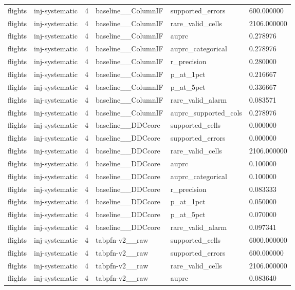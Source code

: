 \begin{tabular}{llllll}
flights & inj-systematic & 4 & baseline\_\_ColumnIF & supported\_errors & 600.000000 \\
flights & inj-systematic & 4 & baseline\_\_ColumnIF & rare\_valid\_cells & 2106.000000 \\
flights & inj-systematic & 4 & baseline\_\_ColumnIF & auprc & 0.278976 \\
flights & inj-systematic & 4 & baseline\_\_ColumnIF & auprc\_categorical & 0.278976 \\
flights & inj-systematic & 4 & baseline\_\_ColumnIF & r\_precision & 0.280000 \\
flights & inj-systematic & 4 & baseline\_\_ColumnIF & p\_at\_1pct & 0.216667 \\
flights & inj-systematic & 4 & baseline\_\_ColumnIF & p\_at\_5pct & 0.336667 \\
flights & inj-systematic & 4 & baseline\_\_ColumnIF & rare\_valid\_alarm & 0.083571 \\
flights & inj-systematic & 4 & baseline\_\_ColumnIF & auprc\_supported\_cols & 0.278976 \\
flights & inj-systematic & 4 & baseline\_\_DDCcore & supported\_cells & 0.000000 \\
flights & inj-systematic & 4 & baseline\_\_DDCcore & supported\_errors & 0.000000 \\
flights & inj-systematic & 4 & baseline\_\_DDCcore & rare\_valid\_cells & 2106.000000 \\
flights & inj-systematic & 4 & baseline\_\_DDCcore & auprc & 0.100000 \\
flights & inj-systematic & 4 & baseline\_\_DDCcore & auprc\_categorical & 0.100000 \\
flights & inj-systematic & 4 & baseline\_\_DDCcore & r\_precision & 0.083333 \\
flights & inj-systematic & 4 & baseline\_\_DDCcore & p\_at\_1pct & 0.050000 \\
flights & inj-systematic & 4 & baseline\_\_DDCcore & p\_at\_5pct & 0.070000 \\
flights & inj-systematic & 4 & baseline\_\_DDCcore & rare\_valid\_alarm & 0.097341 \\
flights & inj-systematic & 4 & tabpfn-v2\_\_raw & supported\_cells & 6000.000000 \\
flights & inj-systematic & 4 & tabpfn-v2\_\_raw & supported\_errors & 600.000000 \\
flights & inj-systematic & 4 & tabpfn-v2\_\_raw & rare\_valid\_cells & 2106.000000 \\
flights & inj-systematic & 4 & tabpfn-v2\_\_raw & auprc & 0.083640 \\

\end{tabular}
